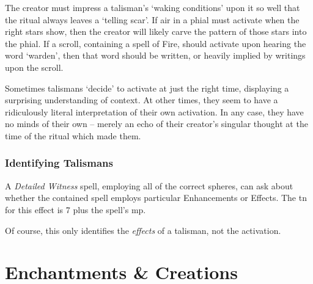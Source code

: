 \begin{multicols}{2}
The creator must impress a talisman's `waking conditions' upon it so well that the ritual always leaves a `telling scar'.
If air in a phial must activate when the right stars show, then the creator will likely carve the pattern of those stars into the phial.
If a scroll, containing a spell of Fire, should activate upon hearing the word `warden', then that word should be written, or heavily implied by writings upon the scroll.

Sometimes talismans `decide' to activate at just the right time, displaying a surprising understanding of context.
At other times, they seem to have a ridiculously literal interpretation of their own activation.
In any case, they have no minds of their own -- merely an echo of their creator's singular thought at the time of the ritual which made them.

\subsubsection{Identifying Talismans}

A \textit{Detailed Witness} spell, employing all of the correct spheres, can ask about whether the contained spell employs particular Enhancements or Effects.
The \gls{tn} for this effect is 7 plus the spell's \gls{mp}.

Of course, this only identifies the \emph{effects} of a talisman, not the activation.

\end{multicols}

\section{Enchantments \& Creations}
\label{magicalMinds}

